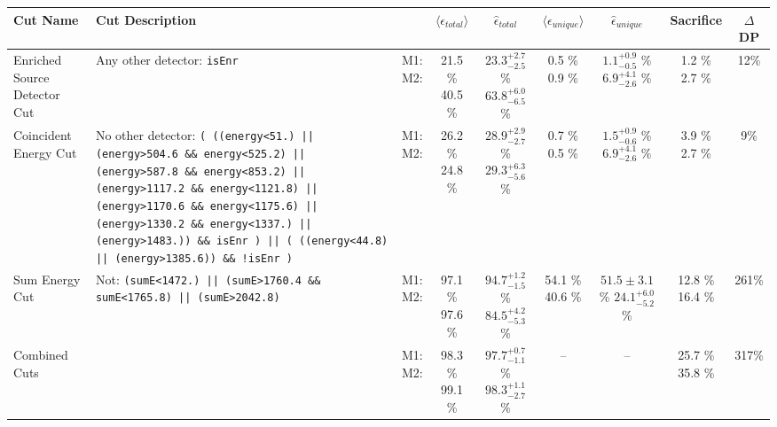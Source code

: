 \small
\begin{tabular}{|>{\raggedright}m{3cm}|m{6cm}|c c c|c c|c|c|}
\hline
  Cut Name & Cut Description &   & $\langle\epsilon_{total}\rangle$ & $\hat{\epsilon}_{total}$ & $\langle\epsilon_{unique}\rangle$ & $\hat{\epsilon}_{unique}$ & Sacrifice & $\Delta$DP \\
\hline
  Enriched Source Detector Cut & \tiny Any other detector: \texttt{isEnr} & \makecell{M1: \\ M2:} & \makecell{21.5 \% \\ 40.5 \%} & \makecell{$23.3^{+2.7}_{-2.5}$ \% \\ $63.8^{+6.0}_{-6.5}$ \%} & \makecell{0.5 \% \\ 0.9 \%} & \makecell{$1.1^{+0.9}_{-0.5}$ \% \\ $6.9^{+4.1}_{-2.6}$ \%} & \makecell{1.2 \% \\ 2.7 \%} & 12\% \\
  Coincident Energy Cut & \tiny No other detector: \texttt{( ((energy<51.) || (energy>504.6 \&\& energy<525.2) || (energy>587.8 \&\& energy<853.2) || (energy>1117.2 \&\& energy<1121.8) || (energy>1170.6 \&\& energy<1175.6) || (energy>1330.2 \&\& energy<1337.) || (energy>1483.)) \&\& isEnr ) || ( ((energy<44.8) || (energy>1385.6)) \&\& !isEnr )} & \makecell{M1: \\ M2:} & \makecell{26.2 \% \\ 24.8 \%} & \makecell{$28.9^{+2.9}_{-2.7}$ \% \\ $29.3^{+6.3}_{-5.6}$ \%} & \makecell{0.7 \% \\ 0.5 \%} & \makecell{$1.5^{+0.9}_{-0.6}$ \% \\ $6.9^{+4.1}_{-2.6}$ \%} & \makecell{3.9 \% \\ 2.7 \%} & 9\% \\
  Sum Energy Cut & \tiny Not:  \texttt{(sumE<1472.) || (sumE>1760.4 \&\& sumE<1765.8) || (sumE>2042.8)} & \makecell{M1: \\ M2:} & \makecell{97.1 \% \\ 97.6 \%} & \makecell{$94.7^{+1.2}_{-1.5}$ \% \\ $84.5^{+4.2}_{-5.3}$ \%} & \makecell{54.1 \% \\ 40.6 \%} & \makecell{$51.5 \pm 3.1$ \% \\ $24.1^{+6.0}_{-5.2}$ \%} & \makecell{12.8 \% \\ 16.4 \%} & 261\% \\
  Combined Cuts &  & \makecell{M1: \\ M2:} & \makecell{98.3 \% \\ 99.1 \%} & \makecell{$97.7^{+0.7}_{-1.1}$ \% \\ $98.3^{+1.1}_{-2.7}$ \%} & -- & -- & \makecell{25.7 \% \\ 35.8 \%} & 317\% \\
\hline
\end{tabular}
